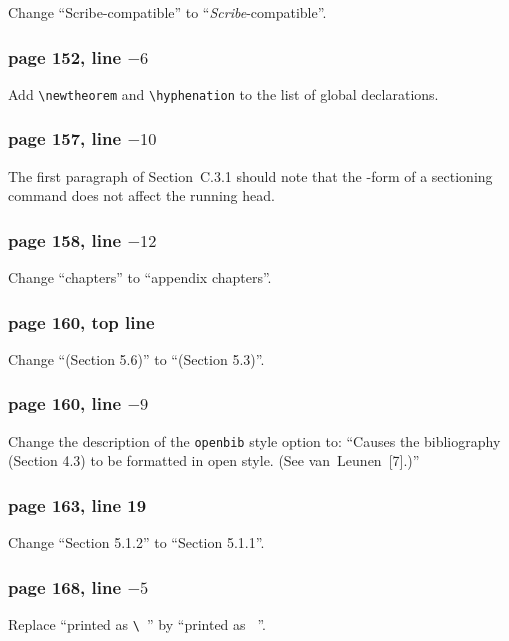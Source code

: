 Change ``Scribe-compatible'' to ``{\em Scribe\/}-compatible''.

\subsubsection*{page 152, line $-6$}
Add \verb|\newtheorem| and \verb|\hyphenation| to the list
of global declarations.


\subsubsection*{page 157, line $-10$}
The first paragraph of Section~C.3.1 should note that the {\tt *}-form
of a sectioning command does not affect the running head.


\subsubsection*{page 158, line $-12$}
Change ``chapters'' to ``appendix chapters''.

\subsubsection*{page 160, top line}

Change ``(Section 5.6)'' to ``(Section 5.3)''.

\subsubsection*{page 160, line $-9$}

Change the description of the {\tt openbib} style option to: ``Causes
the bibliography (Section 4.3) to be formatted in open style.  (See
van~Leunen~[7].)''


\subsubsection*{page 163, line 19}
Change ``Section 5.1.2'' to ``Section 5.1.1''.

\subsubsection*{page 168, line $-5$}

Replace ``printed as \verb*|\ |'' by ``printed as \verb*| |''.

